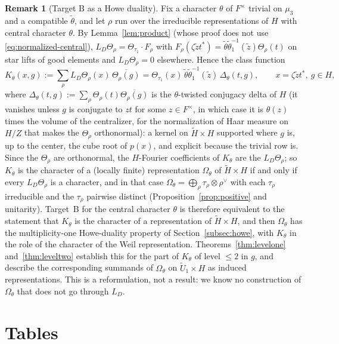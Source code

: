 \documentclass[11pt]{article}
\newcommand{\tH}{\widetilde H}
\newcommand{\tU}{\widetilde U}
\newcommand{\tth}{\widetilde\theta}
\theoremstyle{plain}
\theoremstyle{definition}
\newtheorem{remark}[theorem]{Remark}
\begin{document}
\begin{remark}[Target B as a Howe duality]\label{rem:howe-duality}
Fix a character $\theta$ of $F^\times$ trivial on $\mu_3$ and a
compatible $\tth$, and let $\rho$ run over the irreducible
representations of $H$ with central character $\theta$.  By
Lemma~\ref{lem:product} (whose proof does not use
\eqref{eq:normalized-central}), $L_D\Theta_\rho=\Theta_{\tau_1}\cdot F_\rho$
with $F_\rho(\zeta\tilde zt^*)=\tth\tth_1^{-1}(\tilde z)\Theta_\rho(t)$ on
star lifts of good elements and $L_D\Theta_\rho=0$ elsewhere.  Hence
the class function
\[
 K_\theta(x,g):=\sum_\rho L_D\Theta_\rho(x)\,\overline{\Theta_\rho(g)}
 =\Theta_{\tau_1}(x)\,\tth\tth_1^{-1}(\tilde z)\,\Delta_\theta(t,g),\qquad x=\zeta\tilde zt^*,\ g\in H,
\]
where $\Delta_\theta(t,g):=\sum_\rho\Theta_\rho(t)\overline{\Theta_\rho(g)}$
is the $\theta$-twisted conjugacy delta of $H$ (it vanishes unless $g$
is conjugate to $zt$ for some $z\in F^\times$, in which case it is
$\theta(z)$ times the volume of the centralizer, for the normalization
of Haar measure on $H/Z$ that makes the $\Theta_\rho$ orthonormal): a
kernel on $\tH\times H$ supported where $g$ is, up to the center, the
cube root of $p(x)$, and explicit because the trivial row is.  Since the
$\Theta_\rho$ are orthonormal, the $H$-Fourier coefficients of
$K_\theta$ are the $L_D\Theta_\rho$; so $K_\theta$ is the character of a
(locally finite) representation $\Omega_\theta$ of $\tH\times H$ if and
only if every $L_D\Theta_\rho$ is a character, and in that case
$\Omega_\theta=\bigoplus_\rho\tau_\rho\otimes\rho^\vee$ with each
$\tau_\rho$ irreducible and the $\tau_\rho$ pairwise distinct
(Proposition~\ref{prop:positive} and unitarity).  Target~B for the
central character $\theta$ is therefore equivalent to the statement
that $K_\theta$ is the character of a representation of $\tH\times H$,
and then $\Omega_\theta$ has the multiplicity-one Howe-duality property
of Section~\ref{subsec:howe}, with $K_\theta$ in the role of the
character of the Weil representation.  Theorems~\ref{thm:levelone}
and~\ref{thm:leveltwo} establish this for the part of $K_\theta$ of
level $\le2$ in $g$, and describe the corresponding summands of
$\Omega_\theta$ on $\tU_1\times H$ as induced representations.  This is
a reformulation, not a result: we know no construction of
$\Omega_\theta$ that does not go through $L_D$.
\end{remark}

\appendix
\section{Tables}\label{app:tables}
\end{document}
